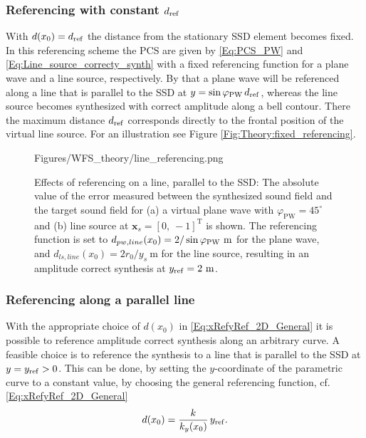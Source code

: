 \subsubsection[Referencing with constant dref]{Referencing with constant $d_{\mathrm{ref}}$}
With $d(x_0) = d_{\mathrm{ref}}$ the distance from the stationary SSD element becomes fixed. 
In this referencing scheme the PCS are given by \eqref{Eq:PCS_PW} and \eqref{Eq:Line_source_correcty_synth} with a fixed referencing function
for a plane wave and a line source, respectively. 
By that a plane wave will be referenced along a line that is parallel to the SSD at $y = \sin\varphi_\text{PW}\,d_{\mathrm{ref}}$, whereas the line source becomes synthesized with correct amplitude along a bell contour. 
There the maximum distance $d_{\mathrm{ref}}$ corresponds directly to the frontal position of the virtual line source. 
For an illustration see Figure \ref{Fig:Theory:fixed_referencing}.

\begin{figure}
	\centering
	\begin{overpic}[width = .85\columnwidth ]{Figures/WFS_theory/line_referencing.png}
	\scriptsize
	\end{overpic}
\caption{Effects of referencing on a line, parallel to the SSD: The absolute value of the error measured between the synthesized sound field and the target sound field for (a) a virtual plane wave with $\varphi_\text{PW} = 45^{\circ}$  and (b) line source at $\mathbf{x}_s = [0,\ -1]^{\mathrm{T}}$ is shown. 
The referencing function is set to $d_{pw,line}(x_0) = 2 / \sin\varphi_\text{PW} ~\mathrm{m}$ for the plane wave, and $d_{ls,line}(x_0) = 2 r_0/y_s ~\mathrm{m}$ for the line source, resulting in an amplitude correct synthesis at $y_{\mathrm{ref}} = 2~\mathrm{m}$.}
	\label{Fig:Theory:line_referencing}
\end{figure}

\subsubsection{Referencing along a parallel line}
With the appropriate choice of $d(x_0)$ in \eqref{Eq:xRefyRef_2D_General} it is possible to reference amplitude correct synthesis along an arbitrary curve. 
A feasible choice is to reference the synthesis to a line that is parallel to the SSD at $y=y_{\mathrm{ref}}>0$. 
This can be done, by setting the $y$-coordinate of the parametric curve to a constant value, by choosing the general referencing function, cf. \eqref{Eq:xRefyRef_2D_General}
\begin{align}
\label{Eq:General_line_Ref_fun}
d(x_0) = \frac{k}{k_y(x_0)}\,y_{\mathrm{ref}}.
\end{align}

